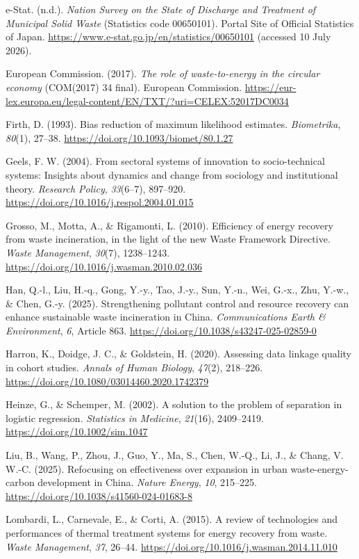 \documentclass[12pt,a4paper]{article}
\begin{document}
e-Stat. (n.d.). \textit{Nation Survey on the State of Discharge and Treatment
of Municipal Solid Waste} (Statistics code 00650101). Portal Site of Official
Statistics of Japan. \url{https://www.e-stat.go.jp/en/statistics/00650101}
(accessed 10 July 2026).

European Commission. (2017). \textit{The role of waste-to-energy in the
circular economy} (COM(2017) 34 final). European Commission.
\url{https://eur-lex.europa.eu/legal-content/EN/TXT/?uri=CELEX:52017DC0034}

Firth, D. (1993). Bias reduction of maximum likelihood estimates.
\textit{Biometrika}, \textit{80}(1), 27--38.
\url{https://doi.org/10.1093/biomet/80.1.27}

Geels, F. W. (2004). From sectoral systems of innovation to socio-technical
systems: Insights about dynamics and change from sociology and institutional
theory. \textit{Research Policy}, \textit{33}(6--7), 897--920.
\url{https://doi.org/10.1016/j.respol.2004.01.015}

Grosso, M., Motta, A., \& Rigamonti, L. (2010). Efficiency of energy recovery
from waste incineration, in the light of the new Waste Framework Directive.
\textit{Waste Management}, \textit{30}(7), 1238--1243.
\url{https://doi.org/10.1016/j.wasman.2010.02.036}

Han, Q.-l., Liu, H.-q., Gong, Y.-y., Tao, J.-y., Sun, Y.-n., Wei, G.-x., Zhu,
Y.-w., \& Chen, G.-y. (2025). Strengthening pollutant control and resource
recovery can enhance sustainable waste incineration in China.
\textit{Communications Earth \& Environment}, \textit{6}, Article 863.
\url{https://doi.org/10.1038/s43247-025-02859-0}

Harron, K., Doidge, J. C., \& Goldstein, H. (2020). Assessing data linkage
quality in cohort studies. \textit{Annals of Human Biology}, \textit{47}(2),
218--226. \url{https://doi.org/10.1080/03014460.2020.1742379}

Heinze, G., \& Schemper, M. (2002). A solution to the problem of separation in
logistic regression. \textit{Statistics in Medicine}, \textit{21}(16),
2409--2419. \url{https://doi.org/10.1002/sim.1047}

Liu, B., Wang, P., Zhou, J., Guo, Y., Ma, S., Chen, W.-Q., Li, J., \& Chang,
V. W.-C. (2025). Refocusing on effectiveness over expansion in urban
waste-energy-carbon development in China. \textit{Nature Energy}, \textit{10},
215--225. \url{https://doi.org/10.1038/s41560-024-01683-8}

Lombardi, L., Carnevale, E., \& Corti, A. (2015). A review of technologies and
performances of thermal treatment systems for energy recovery from waste.
\textit{Waste Management}, \textit{37}, 26--44.
\url{https://doi.org/10.1016/j.wasman.2014.11.010}
\end{document}
